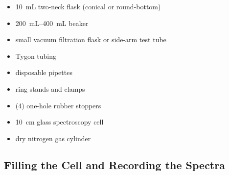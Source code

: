 \begin{itemize}
	\item \qty{10}{\mL} two-neck flask (conical or round-bottom) 
	\item \qtyrange{200}{400}{\mL} beaker
	\item small vacuum filtration flask or side-arm test tube
	\item Tygon tubing
	\item disposable pipettes
	\item ring stands and clamps
	\item (4) one-hole rubber stoppers
	\item \qty{10}{\cm} glass spectroscopy cell
	\item dry nitrogen gas cylinder
\end{itemize}


\subsection{Filling the Cell and Recording the Spectra} %
\label{sub:filling_the_cell}



%

